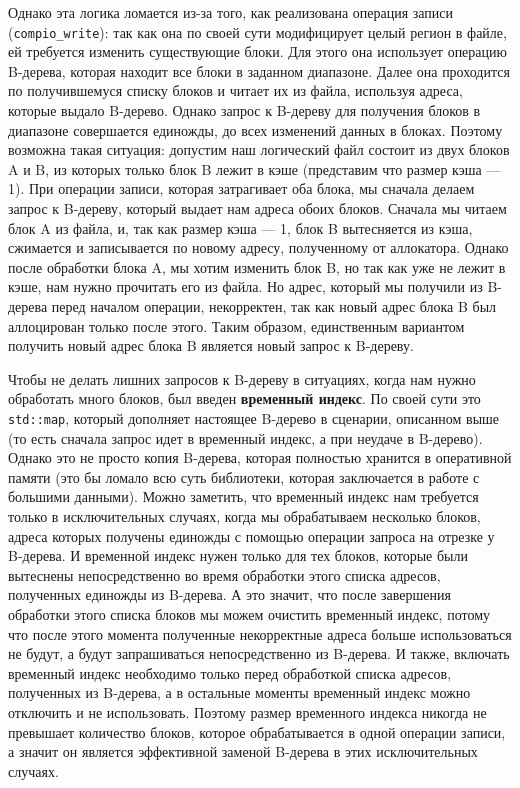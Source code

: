 Однако эта логика ломается из-за того, как реализована операция записи (\texttt{compio\_write}): так как она по своей сути модифицирует целый регион в файле, ей требуется изменить существующие блоки. Для этого она использует операцию B-дерева, которая находит все блоки в заданном диапазоне. Далее она проходится по получившемуся списку блоков и читает их из файла, используя адреса, которые выдало B-дерево. Однако запрос к B-дереву для получения блоков в диапазоне совершается единожды, до всех изменений данных в блоках. Поэтому возможна такая ситуация: допустим наш логический файл состоит из двух блоков A и B, из которых только блок B лежит в кэше (представим что размер кэша --- 1). При операции записи, которая затрагивает оба блока, мы сначала делаем запрос к B-дереву, который выдает нам адреса обоих блоков. Сначала мы читаем блок A из файла, и, так как размер кэша --- 1, блок B вытесняется из кэша, сжимается и записывается по новому адресу, полученному от аллокатора. Однако после обработки блока A, мы хотим изменить блок B, но так как уже не лежит в кэше, нам нужно прочитать его из файла. Но адрес, который мы получили из B-дерева перед началом операции, некорректен, так как новый адрес блока B был аллоцирован только после этого. Таким образом, единственным вариантом получить новый адрес блока B является новый запрос к B-дереву.

Чтобы не делать лишних запросов к B-дереву в ситуациях, когда нам нужно обработать много блоков, был введен \textbf{временный индекс}. По своей сути это \texttt{std::map}, который дополняет настоящее B-дерево в сценарии, описанном выше (то есть сначала запрос идет в временный индекс, а при неудаче в B-дерево). Однако это не просто копия B-дерева, которая полностью хранится в оперативной памяти (это бы ломало всю суть библиотеки, которая заключается в работе с большими данными). Можно заметить, что временный индекс нам требуется только в исключительных случаях, когда мы обрабатываем несколько блоков, адреса которых получены единожды с помощью операции запроса на отрезке у B-дерева. И временной индекс нужен только для тех блоков, которые были вытеснены непосредственно во время обработки этого списка адресов, полученных единожды из B-дерева. А это значит, что после завершения обработки этого списка блоков мы можем очистить временный индекс, потому что после этого момента полученные некорректные адреса больше использоваться не будут, а будут запрашиваться непосредственно из B-дерева. И также, включать временный индекс необходимо только перед обработкой списка адресов, полученных из B-дерева, а в остальные моменты временный индекс можно отключить и не использовать. Поэтому размер временного индекса никогда не превышает количество блоков, которое обрабатывается в одной операции записи, а значит он является эффективной заменой B-дерева в этих исключительных случаях.


